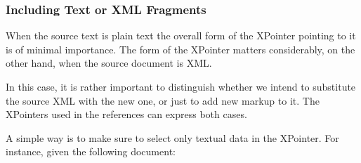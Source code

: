 \subsubsection[{Including Text or XML Fragments}]{Including Text or XML Fragments}\label{SASOfr}\par
When the source text is plain text the overall form of the XPointer pointing to it is of minimal importance. The form of the XPointer matters considerably, on the other hand, when the source document is XML.\par
In this case, it is rather important to distinguish whether we intend to substitute the source XML with the new one, or just to add new markup to it. The XPointers used in the references can express both cases.\par
A simple way is to make sure to select only textual data in the XPointer. For instance, given the following document: \mbox{}\newline 
